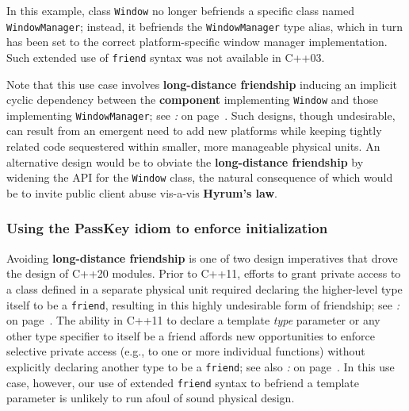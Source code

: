 
In this example, class \texttt{Window} no longer befriends a specific
class named \texttt{WindowManager}; instead, it befriends the
\texttt{WindowManager} type alias, which in turn has been set to the
correct platform-specific window manager implementation. Such extended
use of \texttt{friend} syntax was not available in C++03.

Note that this use case involves \textbf{long-distance friendship}
inducing an implicit cyclic dependency between the \textbf{component}
implementing \texttt{Window} and those implementing
\texttt{WindowManager}; see \textit{: } on page~\pageref{long-distance-friendship}. Such designs, though
undesirable, can result from an emergent need to add new platforms while
keeping tightly related code sequestered within smaller, more manageable
physical units. An alternative design would be to obviate the
\textbf{long-distance friendship} by widening the API for the
\texttt{Window} class, the natural consequence of which would be to
invite public client abuse vis-a-vis \textbf{Hyrum's law}.

\subsubsection[Using the {\tt PassKey} idiom to enforce initialization]{Using the {\SubsubsecCode PassKey} idiom to enforce initialization}\label{using-the-passkey-idiom-to-enforce-initialization}

Avoiding \textbf{long-distance friendship} is one of two design
imperatives that drove the design of C++20 modules. Prior to C++11,
efforts to grant private access to a class defined in a separate
physical unit required declaring the higher-level type itself to be a
\texttt{friend}, resulting in this highly undesirable form of
friendship; see \textit{: } on page~\pageref{long-distance-friendship}. The ability in C++11 to
declare a template \emph{type} parameter or any other type specifier to
itself be a friend affords new opportunities to enforce selective
private access (e.g., to one or more individual functions) without
explicitly declaring another type to be a \texttt{friend}; see also \textit{: } on page~\pageref{granting-a-specific-type-access-to-a-single-private-function}. In this use case, however, our use of extended
\texttt{friend} syntax to befriend a template parameter is unlikely to run
afoul of sound physical design.

